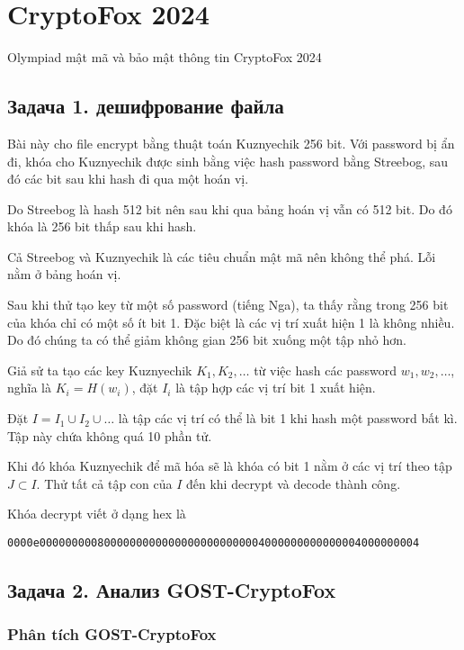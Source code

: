 \chapter*{CryptoFox 2024}

Olympiad mật mã và bảo mật thông tin CryptoFox 2024

\section*{Задача 1. дешифрование файла}

Bài này cho file encrypt bằng thuật toán Kuznyechik 256 bit. Với password bị ẩn đi, khóa cho Kuznyechik được sinh bằng việc hash password bằng Streebog, sau đó các bit sau khi hash đi qua một hoán vị.

Do Streebog là hash 512 bit nên sau khi qua bảng hoán vị vẫn có 512 bit. Do đó khóa là 256 bit thấp sau khi hash.

Cả Streebog và Kuznyechik là các tiêu chuẩn mật mã nên không thể phá. Lỗi nằm ở bảng hoán vị.

Sau khi thử tạo key từ một số password (tiếng Nga), ta thấy rằng trong 256 bit của khóa chỉ có một số ít bit 1. Đặc biệt là các vị trí xuất hiện 1 là không nhiều. Do đó chúng ta có thể giảm không gian 256 bit xuống một tập nhỏ hơn.

Giả sử ta tạo các key Kuznyechik $K_1, K_2, \ldots$ từ việc hash các password $w_1, w_2, \ldots$, nghĩa là $K_i = H(w_i)$, đặt $I_i$ là tập hợp các vị trí bit 1 xuất hiện.

Đặt $I = I_1 \cup I_2 \cup \ldots$ là tập các vị trí có thể là bit 1 khi hash một password bất kì. Tập này chứa không quá 10 phần tử.

Khi đó khóa Kuznyechik để mã hóa sẽ là khóa có bit 1 nằm ở các vị trí theo tập $J \subset I$. Thử tất cả tập con của $I$ đến khi decrypt và decode thành công.

Khóa decrypt viết ở dạng hex là

\texttt{0000e00000000080000000000000000000000004000000000000004000000004}

\section*{Задача 2. Анализ GOST-CryptoFox}

\subsection*{Phân tích GOST-CryptoFox}

